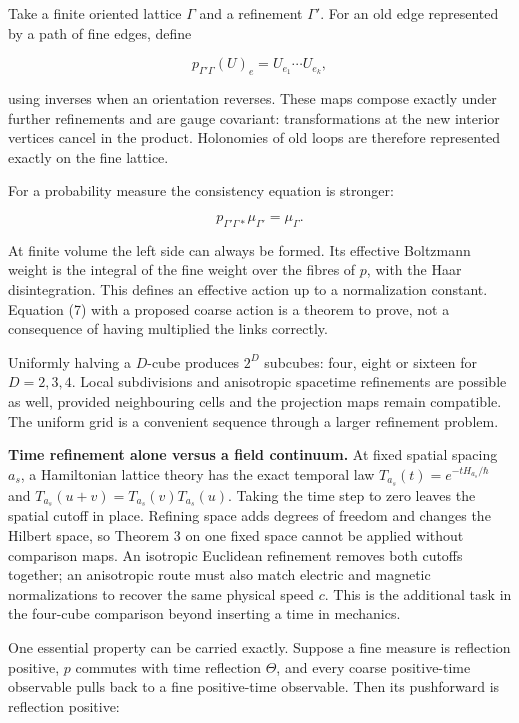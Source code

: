 \documentclass[11pt,a4paper]{article}
\begin{document}
Take a finite oriented lattice \(\Gamma\) and a refinement \(\Gamma'\).
For an old edge represented by a path of fine edges, define

\[p_{\Gamma'\Gamma}(U)_e=U_{e_1}\cdots U_{e_k},\]

using inverses when an orientation reverses. These maps compose exactly
under further refinements and are gauge covariant: transformations at
the new interior vertices cancel in the product. Holonomies of old loops
are therefore represented exactly on the fine lattice.

For a probability measure the consistency equation is stronger:

\[p_{\Gamma'\Gamma*}\mu_{\Gamma'}=\mu_\Gamma. \tag{7}\]

At finite volume the left side can always be formed. Its effective
Boltzmann weight is the integral of the fine weight over the fibres of
\(p\), with the Haar disintegration. This defines an effective action up
to a normalization constant. Equation (7) with a proposed coarse action
is a theorem to prove, not a consequence of having multiplied the links
correctly.

Uniformly halving a \(D\)-cube produces \(2^D\) subcubes: four, eight or
sixteen for \(D=2,3,4\). Local subdivisions and anisotropic spacetime
refinements are possible as well, provided neighbouring cells and the
projection maps remain compatible. The uniform grid is a convenient
sequence through a larger refinement problem.

\textbf{Time refinement alone versus a field continuum.} At fixed
spatial spacing \(a_s\), a Hamiltonian lattice theory has the exact
temporal law \(T_{a_s}(t)=e^{-tH_{a_s}/\hbar}\) and
\(T_{a_s}(u+v)=T_{a_s}(v)T_{a_s}(u)\). Taking the time step to zero
leaves the spatial cutoff in place. Refining space adds degrees of
freedom and changes the Hilbert space, so Theorem 3 on one fixed space
cannot be applied without comparison maps. An isotropic Euclidean
refinement removes both cutoffs together; an anisotropic route must also
match electric and magnetic normalizations to recover the same physical
speed \(c\). This is the additional task in the four-cube comparison
beyond inserting a time in mechanics.

One essential property can be carried exactly. Suppose a fine measure is
reflection positive, \(p\) commutes with time reflection \(\Theta\), and
every coarse positive-time observable pulls back to a fine positive-time
observable. Then its pushforward is reflection positive:
\end{document}
